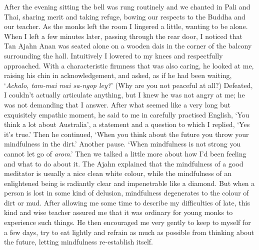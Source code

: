 After the evening sitting the bell was rung routinely and we chanted in
Pali and Thai, sharing merit and taking refuge, bowing our respects to
the Buddha and our teacher. As the monks left the room I lingered a
little, wanting to be alone. When I left a few minutes later, passing
through the rear door, I noticed that Tan Ajahn Anan was seated alone on
a wooden dais in the corner of the balcony surrounding the hall. 
Intuitively I lowered to my knees and respectfully approached. With a
characteristic firmness that was also caring, he looked at me, raising
his chin in acknowledgement, and asked, as if he had been waiting, 
`\emph{Achalo, tam-mai mai sa-ngop ley?}' (Why are you not peaceful at
all?) Defeated, I couldn't actually articulate anything, but I knew he
was not angry at me; he was not demanding that I answer. After what
seemed like a very long but exquisitely empathic moment, he said to me
in carefully practised English, `You think a lot about Australia', a
statement and a question to which I replied, `Yes it's true.' Then he
continued, `When you think about the future you throw your mindfulness
in the dirt.' Another pause. `When mindfulness is not strong you cannot
let go of \emph{arom}.' Then we talked a little more about how I'd been
feeling and what to do about it. The Ajahn explained that the
mindfulness of a good meditator is usually a nice clean white colour, 
while the mindfulness of an enlightened being is radiantly clear and
impenetrable like a diamond. But when a person is lost in some kind of
delusion, mindfulness degenerates to the colour of dirt or mud. After
allowing me some time to describe my difficulties of late, this kind and
wise teacher assured me that it was ordinary for young monks to
experience such things. He then encouraged me very gently to keep to
myself for a few days, try to eat lightly and refrain as much as
possible from thinking about the future, letting mindfulness
re-establish itself. 

